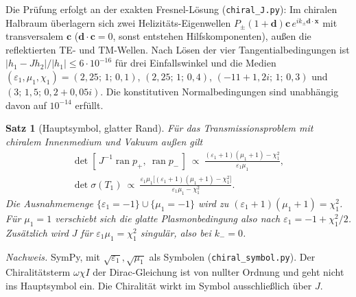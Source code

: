 \documentclass[11pt, a4paper]{article}
\newcommand{\mvec}[1]{\boldsymbol{#1}}
\theoremstyle{plain}
\newtheorem{satz}{Satz}[section]
\theoremstyle{definition}
\newcommand{\status}[1]{\hfill{\small\sffamily[#1]}}
\begin{document}
\noindent Die Prüfung erfolgt an der exakten Fresnel-Lösung (\texttt{chiral\_J.py}): Im
chiralen Halbraum überlagern sich zwei Helizitäts-Eigenwellen
$P_\pm(1+\mvec{d})\mvec{c}\,e^{ik_\pm\mvec{d}\cdot\mvec{x}}$ mit transversalem
$\mvec{c}$ ($\mvec{d}\cdot\mvec{c}=0$, sonst entstehen Hilfskomponenten), außen die
reflektierten TE- und TM-Wellen. Nach Lösen der vier Tangentialbedingungen ist
$|h_1-Jh_2|/|h_1|\le6\cdot10^{-16}$ für drei Einfallswinkel und die Medien
$(\varepsilon_1,\mu_1,\chi_1)=(2{,}25;\,1;\,0{,}1)$, $(2{,}25;\,1;\,0{,}4)$,
$(-11+1{,}2i;\,1;\,0{,}3)$ und $(3;\,1{,}5;\,0{,}2+0{,}05i)$. Die konstitutiven Normalbedingungen sind unabhängig davon auf
$10^{-14}$ erfüllt.

\begin{satz}[Hauptsymbol, glatter Rand]\label{satz:chiralsym}\status{symbolisch}
Für das Transmissionsproblem mit chiralem Innenmedium und Vakuum außen gilt
\begin{gather*}
  \det[\,J^{-1}\operatorname{ran}p_+,\ \operatorname{ran}p_-\,]\ \propto\
  \frac{(\varepsilon_1+1)(\mu_1+1)-\chi_1^2}{\varepsilon_1\mu_1},\\
  \det\sigma(T_1)\ \propto\ \frac{\varepsilon_1\mu_1\big[(\varepsilon_1+1)(\mu_1+1)-\chi_1^2\big]}{\varepsilon_1\mu_1-\chi_1^2}.
\end{gather*}
Die Ausnahmemenge $\{\varepsilon_1=-1\}\cup\{\mu_1=-1\}$ wird zu
$(\varepsilon_1+1)(\mu_1+1)=\chi_1^2$. Für $\mu_1=1$ verschiebt sich die glatte
Plasmonbedingung also nach $\varepsilon_1=-1+\chi_1^2/2$. Zusätzlich wird $J$ für
$\varepsilon_1\mu_1=\chi_1^2$ singulär, also bei $k_-=0$.
\end{satz}
\noindent\emph{Nachweis.} SymPy, mit $\sqrt{\varepsilon_1},\sqrt{\mu_1}$ als Symbolen
(\texttt{chiral\_symbol.py}). Der Chiralitätsterm $\omega\chi I$ der
Dirac-Gleichung ist von nullter Ordnung und geht nicht ins Hauptsymbol ein. Die
Chiralität wirkt im Symbol ausschließlich über $J$.
\end{document}
